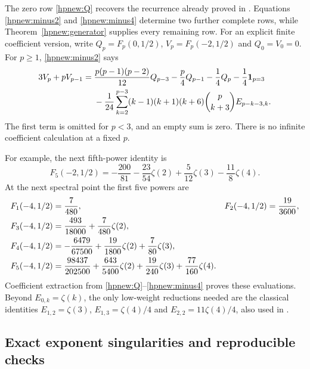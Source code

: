 \documentclass[11pt,a4paper]{article}
\numberwithin{equation}{section}
\theoremstyle{definition}
\theoremstyle{remark}
\begin{document}
The zero row \eqref{hpnew:Q} recovers the recurrence already proved
in \cite{RepoExactResonant}. Equations \eqref{hpnew:minus2} and
\eqref{hpnew:minus4} determine two further complete rows, while
Theorem~\ref{hpnew:generator} supplies every remaining row.
For an explicit finite coefficient version, write
$Q_p=F_p(0,1/2)$, $V_p=F_p(-2,1/2)$ and $Q_0=V_0=0$.
For $p\ge1$, \eqref{hpnew:minus2} says
\begin{align}\label{hpnew:finiteV}
 3V_p+pV_{p-1}
 ={}&\frac{p(p-1)(p-2)}{12}Q_{p-3}
       -\frac p4Q_{p-1}-\frac14Q_p-\frac14\mathbf1_{p=3}\notag\\
 &-\frac1{24}\sum_{k=2}^{p-3}(k-1)(k+1)(k+6)
                     \binom p{k+3}E_{p-k-3,k}.
\end{align}
The first term is omitted for $p<3$, and an empty sum is zero.
There is no infinite coefficient calculation at a fixed $p$.

For example, the next fifth-power identity is
\begin{equation}\label{hpnew:fifth}
 \boxed{\displaystyle
 F_5(-2,1/2)=-\frac{200}{81}-\frac{23}{54}\zeta(2)
                  +\frac5{12}\zeta(3)-\frac{11}{8}\zeta(4).}
\end{equation}
At the next spectral point the first five powers are
\begin{align}
 F_1(-4,1/2)&=\frac7{480},&
 F_2(-4,1/2)&=\frac{19}{3600},\notag\\
 F_3(-4,1/2)&=\frac{493}{18000}+\frac7{480}\zeta(2),
                                                      \label{hpnew:table4}\\
 F_4(-4,1/2)&=-\frac{6479}{67500}+\frac{19}{1800}\zeta(2)
                              +\frac7{80}\zeta(3),\notag\\
 F_5(-4,1/2)&=\frac{98437}{202500}+\frac{643}{5400}\zeta(2)
                +\frac{19}{240}\zeta(3)+\frac{77}{160}\zeta(4).
                                                        \notag
\end{align}
Coefficient extraction from \eqref{hpnew:Q}--\eqref{hpnew:minus4}
proves these evaluations. Beyond $E_{0,k}=\zeta(k)$, the only
low-weight reductions needed are the classical identities
$E_{1,2}=\zeta(3)$, $E_{1,3}=\zeta(4)/4$ and
$E_{2,2}=11\zeta(4)/4$, also used in \cite{RepoExactResonant}.

\subsection{Exact exponent singularities and reproducible checks}
\end{document}
